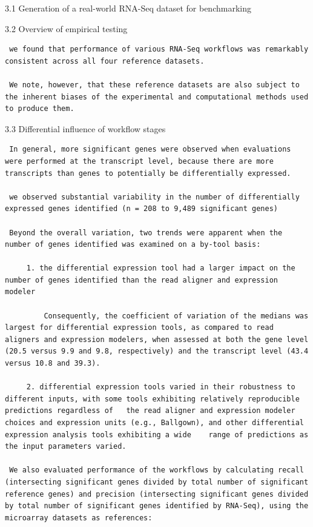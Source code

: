 \documentclass[
]{book}
\begin{document}
\begin{enumerate}
  3.1 Generation of a real-world RNA-Seq dataset for benchmarking

  3.2 Overview of empirical testing

\begin{verbatim}
 we found that performance of various RNA-Seq workflows was remarkably consistent across all four reference datasets.

 We note, however, that these reference datasets are also subject to the inherent biases of the experimental and computational methods used to produce them.
\end{verbatim}

  3.3 Differential influence of workflow stages

\begin{verbatim}
 In general, more significant genes were observed when evaluations were performed at the transcript level, because there are more transcripts than genes to potentially be differentially expressed.

 we observed substantial variability in the number of differentially expressed genes identified (n = 208 to 9,489 significant genes)

 Beyond the overall variation, two trends were apparent when the number of genes identified was examined on a by-tool basis:

     1. the differential expression tool had a larger impact on the number of genes identified than the read aligner and expression modeler

         Consequently, the coefficient of variation of the medians was largest for differential expression tools, as compared to read aligners and expression modelers, when assessed at both the gene level (20.5 versus 9.9 and 9.8, respectively) and the transcript level (43.4 versus 10.8 and 39.3).

     2. differential expression tools varied in their robustness to different inputs, with some tools exhibiting relatively reproducible predictions regardless of   the read aligner and expression modeler choices and expression units (e.g., Ballgown), and other differential expression analysis tools exhibiting a wide    range of predictions as the input parameters varied.

 We also evaluated performance of the workflows by calculating recall (intersecting significant genes divided by total number of significant reference genes) and precision (intersecting significant genes divided by total number of significant genes identified by RNA-Seq), using the microarray datasets as references:


\end{verbatim}
\end{enumerate}
\end{document}
